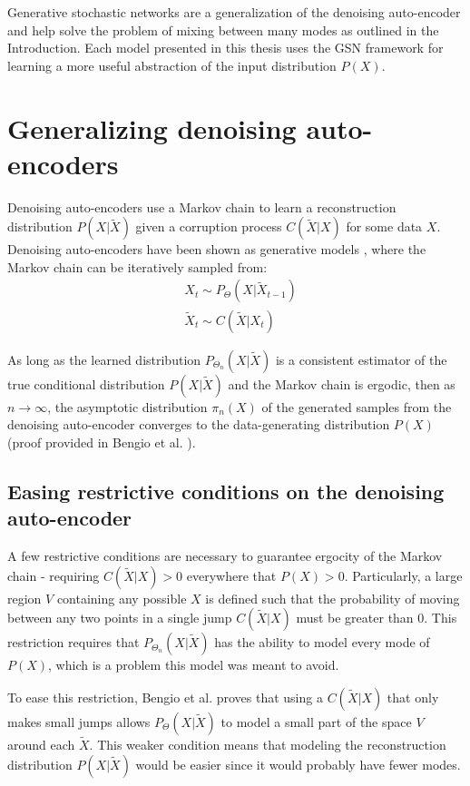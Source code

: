 Generative stochastic networks are a generalization of the denoising auto-encoder and help solve the problem of mixing between many modes as outlined in the Introduction. Each model presented in this thesis uses the GSN framework for learning a more useful abstraction of the input distribution \(P(X)\).



\section{Generalizing denoising auto-encoders}

Denoising auto-encoders use a Markov chain to learn a reconstruction distribution \(P(X|\widetilde{X})\) given a corruption process \(C(\widetilde{X}|X)\) for some data \(X\). Denoising auto-encoders have been shown as generative models \cite{bengio13a}, where the Markov chain can be iteratively sampled from:
\begin{align*}
 &X_t \sim P_\Theta(X|\widetilde{X}_{t-1})\\
 &\widetilde{X}_t \sim C(\widetilde{X}|X_t)
\end{align*}

As long as the learned distribution \(P_{\Theta_n}(X|\widetilde{X})\) is a consistent estimator of the true conditional distribution \(P(X|\widetilde{X})\) and the Markov chain is ergodic, then as \(n \rightarrow \infty\), the asymptotic distribution \(\pi_n(X)\) of the generated samples from the denoising auto-encoder converges to the data-generating distribution \(P(X)\) (proof provided in Bengio et al. \cite{bengio13a}). 


\subsection{Easing restrictive conditions on the denoising auto-encoder}

A few restrictive conditions are necessary to guarantee ergocity of the Markov chain - requiring \(C(\widetilde{X}|X) > 0\) everywhere that \(P(X) > 0\). Particularly, a large region \(V\) containing any possible \(X\) is defined such that the probability of moving between any two points in a single jump \(C(\widetilde{X}|X)\) must be greater than 0. This restriction requires that \(P_{\Theta_n}(X|\widetilde{X})\) has the ability to model every mode of \(P(X)\), which is a problem this model was meant to avoid.

To ease this restriction, Bengio et al. \cite{gsn} proves that using a \(C(\widetilde{X}|X)\) that only makes small jumps allows \(P_{\Theta}(X|\widetilde{X})\) to model a small part of the space \(V\) around each \(\widetilde{X}\). This weaker condition means that modeling the reconstruction distribution \(P(X|\widetilde{X})\) would be easier since it would probably have fewer modes. 

